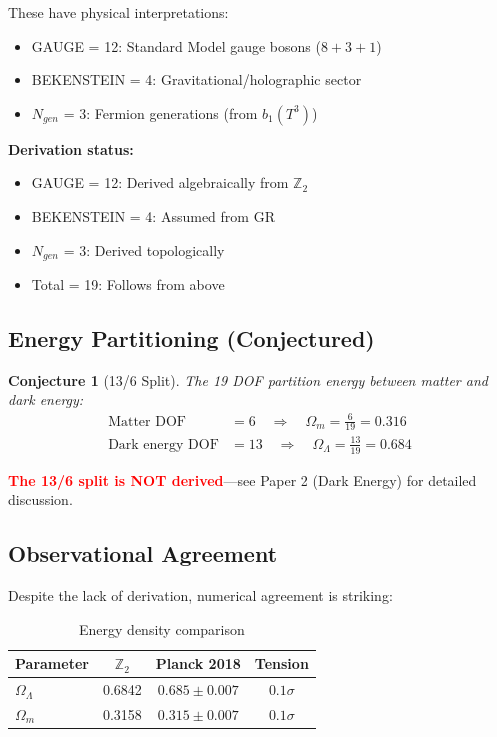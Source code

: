\documentclass[12pt,a4paper]{article}
\newtheorem{conjecture}{Conjecture}
\begin{document}
These have physical interpretations:
\begin{itemize}
    \item GAUGE = 12: Standard Model gauge bosons ($8 + 3 + 1$)
    \item BEKENSTEIN = 4: Gravitational/holographic sector
    \item $N_{gen}$ = 3: Fermion generations (from $b_1(T^3)$)
\end{itemize}

\textbf{Derivation status:}
\begin{itemize}
    \item GAUGE = 12: Derived algebraically from $\mathbb{Z}_2$
    \item BEKENSTEIN = 4: Assumed from GR
    \item $N_{gen}$ = 3: Derived topologically
    \item Total = 19: Follows from above
\end{itemize}

\subsection{Energy Partitioning (Conjectured)}

\begin{conjecture}[13/6 Split]
The 19 DOF partition energy between matter and dark energy:
\begin{align}
\text{Matter DOF} &= 6 \quad \Rightarrow \quad \Omega_m = \frac{6}{19} = 0.316 \\
\text{Dark energy DOF} &= 13 \quad \Rightarrow \quad \Omega_\Lambda = \frac{13}{19} = 0.684
\end{align}
\end{conjecture}

\textcolor{red}{\textbf{The 13/6 split is NOT derived}}---see Paper 2 (Dark Energy) for detailed discussion.

\subsection{Observational Agreement}

Despite the lack of derivation, numerical agreement is striking:

\begin{table}[h]
\centering
\begin{tabular}{lccc}
\toprule
Parameter & $\mathbb{Z}_2$ & Planck 2018 & Tension \\
\midrule
$\Omega_\Lambda$ & 0.6842 & $0.685 \pm 0.007$ & $0.1\sigma$ \\
$\Omega_m$ & 0.3158 & $0.315 \pm 0.007$ & $0.1\sigma$ \\
\bottomrule
\end{tabular}
\caption{Energy density comparison}
\end{table}
\end{document}
